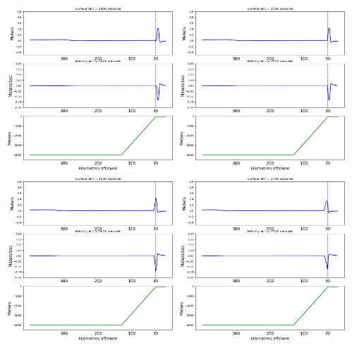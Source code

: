 \documentclass[11pt]{article}
\begin{document}
\vskip 10pt 
\includegraphics[width=0.475\textwidth]{frame0024fig2.png}
\vskip 10pt 
\includegraphics[width=0.475\textwidth]{frame0025fig2.png}
\vskip 10pt 
\includegraphics[width=0.475\textwidth]{frame0026fig2.png}
\vskip 10pt 
\includegraphics[width=0.475\textwidth]{frame0027fig2.png}
\end{document}
